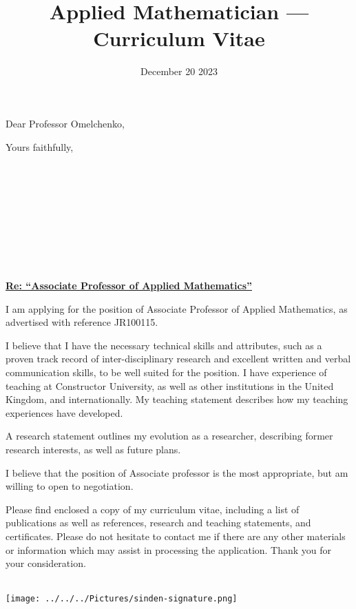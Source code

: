 \documentclass[11pt, a4paper, sans]{moderncv}
\title{Applied Mathematician --- Curriculum Vitae}     %
\makeatletter
\renewcommand*{\addressfont}{\small\mdseries}
\renewcommand*{\makeletterclosing}{
  \@closing\\%
  \texttt{[image: ../../../Pictures/sinden-signature.png]}\\
  {\@firstname~\@lastname}%
  \ifthenelse{\isundefined{\@enclosure}}{}{%
    \\%
    \vfil%
    {\color{color2}\itshape\enclname: \@enclosure}}%
    \vfil}
\newcommand*{\makemyletterhead}{%
  \recomputeletterlengths%
  \hfill%
  \begin{minipage}{.5\textwidth}%
    \if@details%
      \raggedleft%
      \addressfont\textcolor{color2}{%
        {\bfseries\upshape\@firstname~\@lastname}\@firstdetailselementfalse%
        \ifthenelse{\isundefined{\@addressstreet}}{}{\makenewline\addresssymbol\@addressstreet%
          \ifthenelse{\equal{\@addresscity}{}}{}{\makenewline\@addresscity}%
          \ifthenelse{\equal{\@addresscountry}{}}{}{\makenewline\@addresscountry}}%
        \collectionloop{phones}{%
          \makenewline\csname\collectionloopkey phonesymbol\endcsname\collectionloopitem}%
        \ifthenelse{\isundefined{\@email}}{}{\makenewline\emailsymbol\emaillink{\@email}}%
        \ifthenelse{\isundefined{\@homepage}}{}{\makenewline\homepagesymbol\httpslink{\@homepage}}%
        \ifthenelse{\isundefined{\@extrainfo}}{}{\makenewline\@extrainfo}}\fi%
    \end{minipage}\\[2em]
  \begin{minipage}[t]{.5\textwidth}
    \raggedright%
    \addressfont%
    {\bfseries\upshape\@recipientname}\\%
    \@recipientaddress%
  \end{minipage}
  \hfill%
  \@date\\[2em]%
  \ifthenelse{\isundefined{\@subject}}{}{{\bfseries\@subject\\[2em]}}
  \raggedright%
  \@opening\\[1.5em]%
  \hspace{0pt}\par\vspace{-\baselineskip}\vspace{-\parskip}}
\makeatother
\begin{document}

\date{December 20 2023}

\opening{Dear Professor Omelchenko,}

\closing{Yours faithfully,}


\makemyletterhead

\hspace*{0.025\textwidth}
\begin{minipage}{0.95\textwidth}
\textcolor{custom}{\underline{\textbf{Re: \enquote{Associate Professor of Applied Mathematics} }}}
\end{minipage}

I am applying for the position of Associate Professor of Applied Mathematics, as advertised with reference JR100115.

I believe that I have the necessary technical skills and attributes, such as a proven track record of inter-disciplinary research and excellent written and verbal communication skills, to be well suited for the position. I have experience of teaching at Constructor University, as well as other institutions in the United Kingdom, and internationally. My teaching statement describes how my teaching experiences have developed. 

A research statement outlines my evolution as a researcher, describing former research interests, as well as future plans. 

I believe that the position of Associate professor is the most appropriate, but am willing to open to negotiation. 

Please find enclosed a copy of my curriculum vitae, including a list of publications as well as references, research and teaching statements, and certificates. Please do not hesitate to contact me if there are any other materials or information which may assist in processing the application. Thank you for your consideration.  

\makeletterclosing
\end{document}

